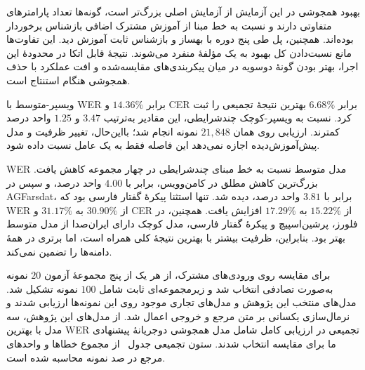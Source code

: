 بهبود همجوشی در این آزمایش از آزمایش اصلی بزرگ‌تر است، گونه‌ها تعداد پارامترهای متفاوتی دارند و نسبت به خط مبنا از آموزش مشترک اضافی بازشناس برخوردار بوده‌اند. همچنین، پل طی پنج دوره با بهساز و بازشناس ثابت آموزش دید. این تفاوت‌ها مانع نسبت‌دادن کل بهبود به یک مؤلفهٔ منفرد می‌شوند. نتیجهٔ قابل اتکا در محدودهٔ این اجرا، بهتر بودن گونهٔ دوسویه در میان پیکربندی‌های مقایسه‌شده و افت عملکرد با حذف همجوشی هنگام استنتاج است.


ویسپر-متوسط با WER برابر $14.36\%$ و CER برابر $6.68\%$ بهترین نتیجهٔ تجمیعی را ثبت کرد. نسبت به ویسپر-کوچک چندشرایطی، این مقادیر به‌ترتیب $3.47$ و $1.25$ واحد درصد کمترند. ارزیابی روی همان $21{,}848$ نمونه انجام شد؛ بااین‌حال، تغییر ظرفیت و مدل پیش‌آموزش‌دیده اجازه نمی‌دهد این فاصله فقط به یک عامل نسبت داده شود.

WER مدل متوسط نسبت به خط مبنای چندشرایطی در چهار مجموعه کاهش یافت. بزرگ‌ترین کاهش مطلق در کامن‌وویس، برابر با $4.00$ واحد درصد، و سپس در AGFarsdat، برابر با $3.81$ واحد درصد، دیده شد. تنها استثنا پیکرهٔ گفتار فارسی بود که WER از $30.90\%$ به $31.17\%$ و CER از $15.22\%$ به $17.29\%$ افزایش یافت. همچنین، در فلورز، پرشین‌اسپیچ و پیکرهٔ گفتار فارسی، مدل کوچک دارای ایران‌صدا از مدل متوسط بهتر بود. بنابراین، ظرفیت بیشتر با بهترین نتیجهٔ کلی همراه است، اما برتری در همهٔ دامنه‌ها را تضمین نمی‌کند.


برای مقایسه روی ورودی‌های مشترک، از هر یک از پنج مجموعهٔ آزمون $20$ نمونه به‌صورت تصادفی انتخاب شد و زیرمجموعه‌ای ثابت شامل $100$ نمونه تشکیل شد. مدل‌های منتخب این پژوهش و مدل‌های تجاری موجود روی این نمونه‌ها ارزیابی شدند و نرمال‌سازی یکسانی بر متن مرجع و خروجی اعمال شد. از مدل‌های این پژوهش، سه مدل با بهترین WER تجمیعی در ارزیابی کامل شامل مدل همجوشی دوجریانهٔ پیشنهادی ما برای مقایسه انتخاب شدند. ستون تجمیعی جدول~ از مجموع خطاها و واحدهای مرجع در صد نمونه محاسبه شده است.

